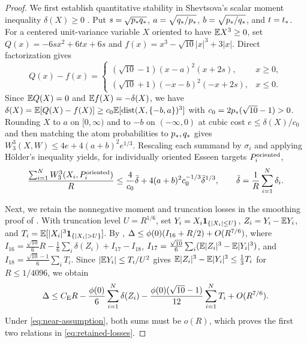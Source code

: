 \begin{proof}
We first establish quantitative stability in Shevtsova's scalar moment
inequality $\delta(X)\ge0$ \citep[Theorem~3.1, pp.~256--262]{Shevtsova2012}.
Put $s=\sqrt{p_*q_*}$, $a=\sqrt{q_*/p_*}$, $b=\sqrt{p_*/q_*}$, and $t=t_*$.
For a centered unit-variance variable $X$ oriented to have $\mathbb E X^3\ge0$, set
$Q(x)=-6sx^2+6tx+6s$ and $f(x)=x^3-\sqrt{10}|x|^3+3|x|$. Direct factorization
gives
\[
 Q(x)-f(x)=
 \begin{cases}
 (\sqrt{10}-1)(x-a)^2(x+2s),&x\ge0,\\
 (\sqrt{10}+1)(-x-b)^2(-x+2s),&x\le0.
 \end{cases}
\]
Since $\mathbb E Q(X)=0$ and $\mathbb E f(X)=-\delta(X)$, we have
$\delta(X)=\mathbb E[Q(X)-f(X)]\ge c_0\mathbb E[\operatorname{dist}(X,\{-b,a\})^3]$ with
$c_0=2p_*(\sqrt{10}-1)>0$. Rounding $X$ to $a$ on $[0,\infty)$ and to $-b$ on
$(-\infty,0)$ at cubic cost $e\le\delta(X)/c_0$ and then matching the atom
probabilities to $p_*,q_*$ gives $W_3^3(X,W)\le4e+4(a+b)^2e^{1/3}$. Rescaling
each summand by $\sigma_i$ and applying H\"older's inequality yields, for
individually oriented Esseen targets $P_i^{\rm oriented}$,
\begin{equation}\label{eq:shape-stability}
 \frac{\sum_{i=1}^N W_3^3(X_i,P_i^{\rm oriented})}{R}
 \le\frac4{c_0}\bar\delta+
       4(a+b)^2c_0^{-1/3}\bar\delta^{1/3},\qquad
 \bar\delta=\frac1R\sum_{i=1}^N\delta_i.
\end{equation}

Next, we retain the nonnegative moment and truncation losses in the smoothing
proof of \citet[pp.~289--296]{Shevtsova2012}. With truncation level
$U=R^{1/6}$, set $Y_i=X_i\mathbf1_{\{|X_i|\le U\}}$, $Z_i=Y_i-\mathbb E Y_i$, and
$T_i=\E[|X_i|^3\ind_{\{|X_i|>U\}}]$. By \citet[Lemma~4.3 and $I_{14}$--$I_{18}$, pp.~272--295]{Shevtsova2012},
$\Delta\le\phi(0)(I_{16}+R/2)+O(R^{7/6})$, where
$I_{16}=\frac{\sqrt{10}}{6}R-\frac16\sum_i\delta(Z_i)+I_{17}-I_{18}$,
$I_{17}=\frac{\sqrt{10}}{6}\sum_i(\mathbb E|Z_i|^3-\mathbb E|Y_i|^3)$, and
$I_{18}=\frac{\sqrt{10}-1}{6}\sum_iT_i$. Since $|\mathbb E Y_i|\le T_i/U^2$ gives
$\mathbb E|Z_i|^3-\mathbb E|Y_i|^3\le\frac13T_i$ for $R\le1/4096$, we obtain
\[
 \Delta\le C_{\mathrm E} R-\frac{\phi(0)}{6}\sum_{i=1}^N\delta(Z_i)
            -\frac{\phi(0)(\sqrt{10}-1)}{12}\sum_{i=1}^NT_i+O(R^{7/6}).
\]
Under \eqref{eq:near-assumption}, both sums must be $o(R)$, which proves the
first two relations in \eqref{eq:retained-losses}.


\end{proof}
